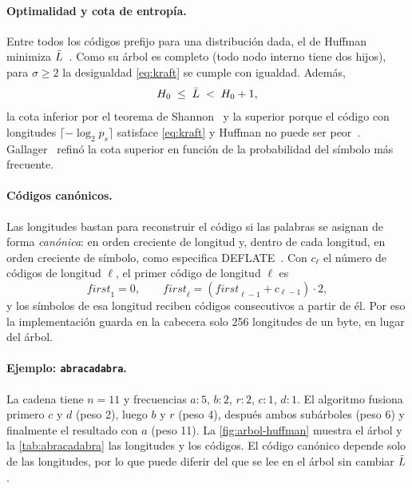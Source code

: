 \paragraph{Optimalidad y cota de entropía.} Entre todos los códigos prefijo para una
distribución dada, el de Huffman minimiza $\bar{L}$~\cite{huffman1952,cormen2022}. Como su árbol
es completo (todo nodo interno tiene dos hijos), para $\sigma \ge 2$ la desigualdad
\eqref{eq:kraft} se cumple con igualdad. Además,
\begin{equation}
  H_0 \;\le\; \bar{L} \;<\; H_0 + 1,
  \label{eq:cota-huffman}
\end{equation}
la cota inferior por el teorema de Shannon~\cite{shannon1948} y la superior porque el código
con longitudes $\lceil -\log_2 p_s\rceil$ satisface \eqref{eq:kraft} y Huffman no puede ser
peor~\cite{sayood2017}. Gallager~\cite{gallager1978} refinó la cota superior en función de la
probabilidad del símbolo más frecuente.

\paragraph{Códigos canónicos.} Las longitudes bastan para reconstruir el código si las palabras
se asignan de forma \emph{canónica}: en orden creciente de longitud y, dentro de cada longitud,
en orden creciente de símbolo, como especifica DEFLATE~\cite{rfc1951}. Con $c_\ell$ el número
de códigos de longitud $\ell$, el primer código de longitud $\ell$ es
\begin{equation}
  \mathit{first}_1 = 0, \qquad \mathit{first}_\ell = \left(\mathit{first}_{\ell-1} + c_{\ell-1}\right) \cdot 2,
  \label{eq:canonico}
\end{equation}
y los símbolos de esa longitud reciben códigos consecutivos a partir de él. Por eso la
implementación guarda en la cabecera solo 256 longitudes de un byte, en lugar del árbol.

\paragraph{Ejemplo: \texttt{abracadabra}.} La cadena tiene $n = 11$ y frecuencias
$a{:}5$, $b{:}2$, $r{:}2$, $c{:}1$, $d{:}1$. El algoritmo fusiona primero $c$ y $d$ (peso 2),
luego $b$ y $r$ (peso 4), después ambos subárboles (peso 6) y finalmente el resultado con $a$
(peso 11). La \cref{fig:arbol-huffman} muestra el árbol y la \cref{tab:abracadabra} las
longitudes y los códigos. El código canónico depende solo de las longitudes, por lo que puede
diferir del que se lee en el árbol sin cambiar $\bar{L}$.


